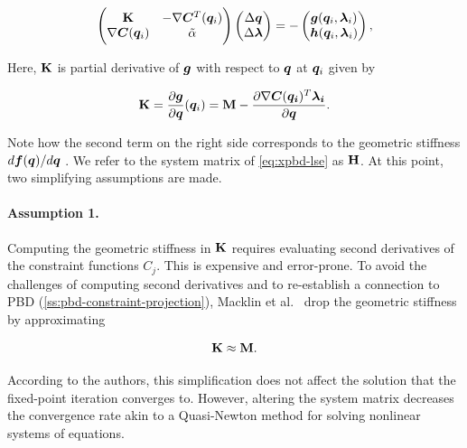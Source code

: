 \begin{equation}\label{eq:xpbd-lse}
    \begin{pmatrix}
        \mathbf{K} & -\nabla\bm{C}^T(\bm{q}_i)\\
        \nabla\bm{C}(\bm{q}_i) & \tilde{\mathbf{\alpha}}
    \end{pmatrix}
    \begin{pmatrix}
        \Delta \bm{q} \\
        \Delta \bm{\lambda}
    \end{pmatrix}
    = -
    \begin{pmatrix}
    \bm{g}(\bm{q}_i, \bm{\lambda}_i) \\
    \bm{h}(\bm{q}_i, \bm{\lambda}_i)
    \end{pmatrix},
\end{equation}

\noindent Here, $\mathbf{K}$ is partial derivative of $\bm{g}$ with respect to $\bm{q}$ at $\bm{q}_i$ given by

\begin{equation}\label{eq:xpbd-K}
    \mathbf{K} = \frac{\partial \bm{g}}{\partial \bm{q}}(\bm{q}_i) = \mathbf{M} - \frac{\partial \nabla \bm{C}(\bm{q_i})^T \bm{\lambda_i}}{\partial \bm{q}}.
\end{equation}

\noindent Note how the second term on the right side corresponds to the geometric stiffness $d\bm{f}(\bm{q})/d\bm{q}$ 
\cite{tournier2015}. We refer to the system matrix of \autoref{eq:xpbd-lse} as $\mathbf{H}$. At this point, two simplifying assumptions 
are made.

\paragraph{Assumption 1.} Computing the geometric stiffness in $\mathbf{K}$ requires evaluating second derivatives of the constraint functions
$C_j$. This is expensive and error-prone. To avoid the challenges of computing second derivatives and to re-establish a connection 
to PBD (\cref{ss:pbd-constraint-projection}), Macklin et al.\ \cite{macklin2016} drop the geometric stiffness by approximating 

\begin{equation}\label{eq:xpbd-assumption-1}
    \mathbf{K} \approx \mathbf{M}. 
\end{equation}

\noindent According to the authors, this simplification does not affect the solution that the fixed-point iteration converges to. However, 
altering the system matrix decreases the convergence rate akin to a Quasi-Newton method for solving nonlinear systems of equations.

